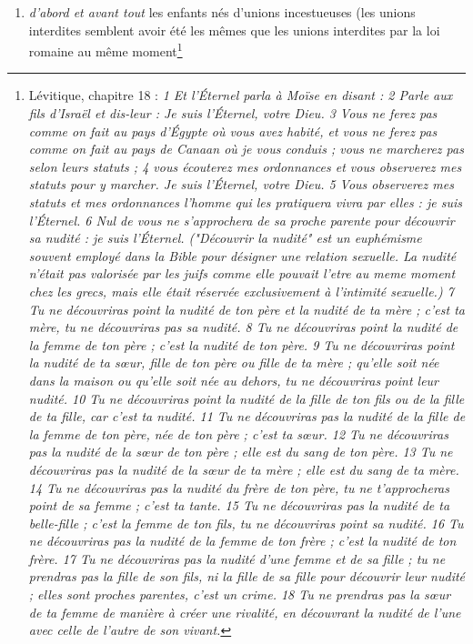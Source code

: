 \begin{enumerate}
 \item \emph{d'abord et avant tout} les enfants nés d'unions incestueuses (les unions interdites semblent avoir été les mêmes que les unions interdites par la loi romaine au même moment\footnote{Lévitique, chapitre 18 : \emph{1 Et l'Éternel parla à Moïse en disant :
2 Parle aux fils d'Israël et dis-leur : Je suis l'Éternel, votre Dieu.
3 Vous ne ferez pas comme on fait au pays d'Égypte où vous avez habité, et vous ne ferez pas comme on fait au pays de Canaan où je vous conduis ; vous ne marcherez pas selon leurs statuts ;
4 vous écouterez mes ordonnances et vous observerez mes statuts pour y marcher. Je suis l'Éternel, votre Dieu.
5 Vous observerez mes statuts et mes ordonnances l'homme qui les pratiquera vivra par elles : je suis l'Éternel.
6 Nul de vous ne s'approchera de sa proche parente pour découvrir sa nudité : je suis l'Éternel.\emph{ ("Découvrir la nudité" est un euphémisme  souvent employé dans la Bible pour désigner une relation sexuelle. La nudité n'était pas valorisée par les juifs comme elle pouvait l'etre au meme moment chez les grecs, mais elle était réservée exclusivement à l'intimité sexuelle.)}
7 Tu ne découvriras point la nudité de ton père et la nudité de ta mère ; c'est ta mère, tu ne découvriras pas sa nudité.
8 Tu ne découvriras point la nudité de la femme de ton père ; c'est la nudité de ton père.
9 Tu ne découvriras point la nudité de ta sœur, fille de ton père ou fille de ta mère ; qu'elle soit née dans la maison ou qu'elle soit née au dehors, tu ne découvriras point leur nudité.
10 Tu ne découvriras point la nudité de la fille de ton fils ou de la fille de ta fille, car c'est ta nudité.
11 Tu ne découvriras pas la nudité de la fille de la femme de ton père, née de ton père ; c'est ta sœur.
12 Tu ne découvriras pas la nudité de la sœur de ton père ; elle est du sang de ton père.
13 Tu ne découvriras pas la nudité de la sœur de ta mère ; elle est du sang de ta mère.
14 Tu ne découvriras pas la nudité du frère de ton père, tu ne t'approcheras point de sa femme ; c'est ta tante.
15 Tu ne découvriras pas la nudité de ta belle-fille ; c'est la femme de ton fils, tu ne découvriras point sa nudité.
16 Tu ne découvriras pas la nudité de la femme de ton frère ; c'est la nudité de ton frère.
17 Tu ne découvriras pas la nudité d'une femme et de sa fille ; tu ne prendras pas la fille de son fils, ni la fille de sa fille pour découvrir leur nudité ; elles sont proches parentes, c'est un crime.
18 Tu ne prendras pas la sœur de ta femme de manière à créer une rivalité, en découvrant la nudité de l'une avec celle de l'autre de son vivant.
}}
\end{enumerate}

